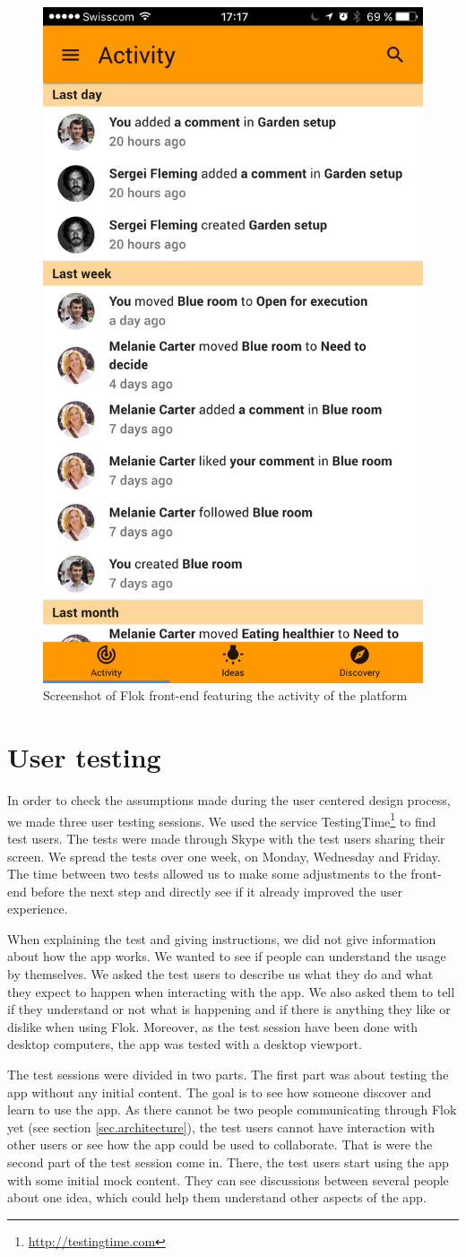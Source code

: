 \documentclass[a4paper,12pt, oneside]{article}
\begin{document}
\begin{figure}[!htb]
    \centering
    \includegraphics[width=.32\textwidth]{images/activity.png}
    \caption{Screenshot of Flok front-end featuring the activity of the platform}
    \label{fig.activity}
\end{figure}

\section{User testing}
In order to check the assumptions made during the user centered design process, we made three user testing sessions.
We used the service TestingTime\footnote{\url{http://testingtime.com}} to find test users.
The tests were made through Skype with the test users sharing their screen.
We spread the tests over one week, on Monday, Wednesday and Friday.
The time between two tests allowed us to make some adjustments to the front-end before the next step and directly see if it already improved the user experience.

When explaining the test and giving instructions, we did not give information about how the app works.
We wanted to see if people can understand the usage by themselves.
We asked the test users to describe us what they do and what they expect to happen when interacting with the app.
We also asked them to tell if they understand or not what is happening and if there is anything they like or dislike when using Flok.
Moreover, as the test session have been done with desktop computers, the app was tested with a desktop viewport.

The test sessions were divided in two parts.
The first part was about testing the app without any initial content.
The goal is to see how someone discover and learn to use the app.
As there cannot be two people communicating through Flok yet (see section \ref{sec.architecture}), the test users cannot have interaction with other users or see how the app could be used to collaborate.
That is were the second part of the test session come in.
There, the test users start using the app with some initial mock content.
They can see discussions between several people about one idea, which could help them understand other aspects of the app.
\end{document}
